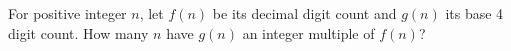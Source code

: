 For positive integer $n$, let $f(n)$ be its decimal digit count and $g(n)$ its base 4 digit count. How many $n$ have $g(n)$ an integer multiple of $f(n)$?
